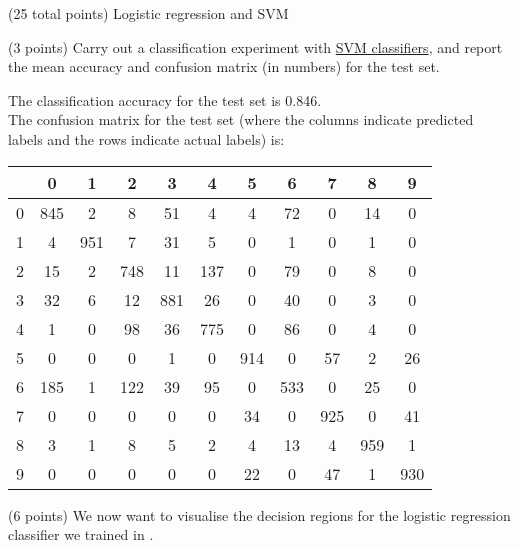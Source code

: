 \documentclass[12pt]{article}
\begin{document}
\begin{question}{(25 total points) Logistic regression and SVM}
\begin{subquestion}
   \end{subquestion}
   \begin{subquestion}{(3 points)
       Carry out a classification experiment with
       \href{https://scikit-learn.org/0.19/modules/generated/sklearn.svm.SVC.html}{SVM classifiers}, and report the
       mean accuracy and confusion matrix (in numbers) for the test
       set.
     } \label{Q2.2}


   

      \begin{answerbox}{30em}
         The classification accuracy for the test set is 0.846. \\
         The confusion matrix for the test set (where the columns indicate predicted labels and the rows indicate actual labels) is:
          \begin{center}
	\begin{tabular}{|c|c|c|c|c|c|c|c|c|c|c|}
		\hline
		& 0 & 1 & 2 & 3 & 4 & 5 & 6 & 7 & 8 & 9  \\  \hline
		0 & 845 &  2 &  8 & 51 &  4 &  4  &72  & 0 & 14 &  0 \\
		1 & 4 &951  & 7 & 31 &  5 &  0  & 1 &  0 &  1  & 0 \\
		2 &15 &  2 &748  &11& 137  & 0 & 79 &  0 &  8  & 0 \\
		3 & 32 &  6 & 12 &881 & 26  & 0  &40 &  0  & 3 &  0 \\
		4 & 1  & 0 & 98 & 36 &775  & 0 & 86  &0  & 4 &  0 \\
		5 & 0 &  0 &  0  & 1 &  0& 914  & 0 & 57   &2 & 26 \\
		6 & 185  & 1 &122 & 39  &95   &0 &533 &  0  &25  & 0 \\
		7 & 0 &  0  & 0 &  0 &  0 & 34 &  0 &925 &  0 & 41 \\
		8 & 3 &  1  & 8 &  5 &  2 &  4  &13&   4 &959 &  1 \\
		9 & 0 &  0 &  0 &  0 &  0 & 22 &  0  &47 &  1& 930 \\
		\hline
	\end{tabular}
	\end{center}
      \end{answerbox}
  


   \end{subquestion}
   \begin{subquestion}{(6 points)
       We now want to visualise the decision regions for the logistic
       regression classifier we trained in .
     } \label{Q2.3}



\end{subquestion}
\end{question}
\end{document}
